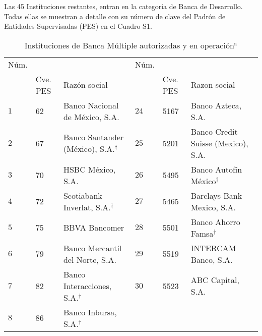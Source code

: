 \documentclass[preprint,floatfix] {revtex4}
\begin{document}
            Las 45 Instituciones restantes, entran en la categoría de Banca de Desarrollo. Todas ellas se muestran a detalle con su número de clave del Padrón de Entidades Supervisadas (PES) en el Cuadro S1.
            \newpage
            \begingroup
                \squeezetable
                \begin{table}[h]
                    \caption {\label{tab:table1} Instituciones de Banca Múltiple autorizadas y en operación$^{\mathrm{a}}$} 
                    \begin{ruledtabular}
                        \begin{tabular}{llllll}
                            Núm. & \multicolumn{2}{c}{} & Núm. & \multicolumn{2}{c}{}    \\ 
                            \cline{2-3} \cline{5-6} 
                                  & Cve. PES & Razón social &   &  Cve. PES   & Razon social   \\    \hline
                            $1$  &  62       & Banco Nacional de México, S.A.  &
                            $24$ &  5167  &   Banco Azteca, S.A.
                            \\       
                            $2$  &  67       & Banco Santander (México), S.A.$^\dag$ & 
                            $25$ &  5201  &   Banco Credit Suisse (Mexico), S.A.
                            \\         
                            $3$  &  70   & HSBC México, S.A. & 
                            $26$ & 5495 & Banco Autofín México$^\dag$
                            \\
                            $4$  & 72    & Scotiabank Inverlat, S.A.$^\dag$           &  
                            $27$ &  5465  &   Barclays Bank Mexico, S.A.
                            \\
                            $5$   & 75    & BBVA Bancomer          &    
                            $28$  & 5501    & Banco Ahorro Famsa$^\dag$
                            \\    
                            $6$  & 79    & Banco Mercantil del Norte, S.A.          &     
                            $29$ & 5519  & INTERCAM Banco, S.A.
                            \\
                            $7$   &  82  & Banco Interacciones, S.A.$^\dag$          &  
                            $30$  &  5523  & ABC Capital, S.A.
                            \\
                            $8$ &   86  &   Banco Inbursa, S.A.$^\dag$    &

\end{tabular}
\end{ruledtabular}
\end{table}
\end{document}

